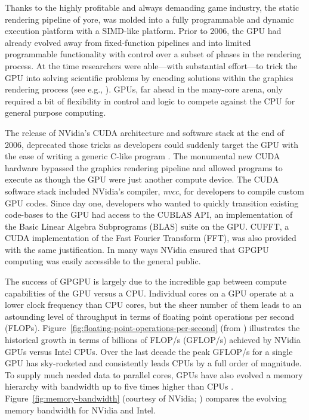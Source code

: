 \documentclass{report}
\begin{document}
Thanks to the highly profitable and always demanding game industry, the static rendering pipeline of yore, was molded into a fully programmable and dynamic execution platform with a SIMD-like platform. Prior to 2006, the GPU had already evolved away from fixed-function pipelines and into limited programmable functionality with control over a subset of phases in the rendering process. At the time researchers were able---with substantial effort---to trick the GPU into solving scientific problems by encoding solutions within the graphics rendering process (see e.g., \cite{Harris2005,Owens2007}).
GPUs, far ahead in the many-core arena, only required a bit of flexibility in control and logic to compete against the CPU for general purpose computing.  

The release of NVidia's CUDA architecture and software stack at the end of 2006, deprecated those tricks as developers could suddenly target the GPU with the ease of writing a generic C-like program \cite{CudaGuide2013}. The monumental new CUDA hardware bypassed the graphics rendering pipeline and allowed programs to execute as though the GPU were just another compute device. The CUDA software stack included NVidia's compiler, \emph{nvcc}, for developers to compile custom GPU codes. Since day one, developers who wanted to quickly transition existing code-bases to the GPU had access to the CUBLAS API, an implementation of the Basic Linear Algebra Subprograms (BLAS) suite on the GPU. CUFFT, a CUDA implementation of the Fast Fourier Transform (FFT), was also provided with the same justification. In many ways NVidia ensured that GPGPU computing was easily accessible to the general public. 


The success of GPGPU is largely due to the incredible gap between compute capabilities of the GPU versus a CPU. Individual cores on a GPU operate at a lower clock frequency than CPU cores, but the sheer number of them leads to an astounding level of throughput in terms of floating point operations per second (FLOPs). Figure~\ref{fig:floating-point-operations-per-second} (from \cite{CudaGuide2013}) illustrates the historical growth in terms of billions of FLOP/s (GFLOP/s) achieved by NVidia GPUs versus Intel CPUs. Over the last decade the peak GFLOP/s for a single GPU has sky-rocketed and consistently leads CPUs by a full order of magnitude. To supply much needed data to parallel cores, GPUs have also evolved a memory hierarchy with bandwidth up to five times higher than CPUs \cite{CudaGuide2013}. Figure~\ref{fig:memory-bandwidth} (courtesy of NVidia; \cite{CudaGuide2013}) compares the evolving memory bandwidth for NVidia and Intel. 
\end{document}

